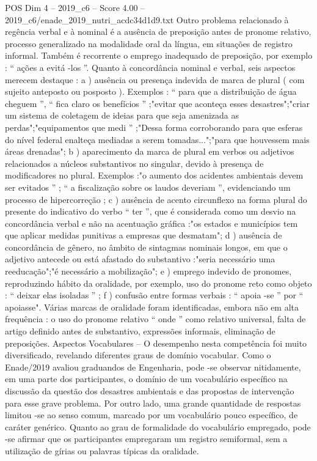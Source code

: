 \begin{textsample}{POS Dim 4 – 2019\_c6 – Score 4.00 – 2019\_c6/enade\_2019\_nutri\_acdc34d1d9.txt}
Outro problema relacionado à regência verbal e à nominal é a ausência de preposição antes de pronome relativo, processo generalizado na modalidade oral da língua, em situações de registro informal.
Também é recorrente o emprego inadequado de preposição, por exemplo : “ ações a evitá -los ”.
Quanto à concordância nominal e verbal, seis aspectos merecem destaque : a ) ausência ou presença indevida de marca de plural ( com sujeito anteposto ou posposto ).
Exemplos : “ para que a distribuição de água cheguem ”, “ fica claro os benefícios ” ;"evitar que aconteça esses desastres";"criar um sistema de coletagem de ideias para que seja amenizada as perdas";"equipamentos que medi ” ;"Dessa forma corroborando para que esferas do nível federal enalteça mediadas a serem tomadas...";"para que houvessem mais áreas drenadas"; b ) aparecimento da marca de plural em verbos ou adjetivos relacionados a núcleos substantivos no singular, devido à presença de modificadores no plural.
Exemplos :"o aumento dos acidentes ambientais devem ser evitados ” ; “ a fiscalização sobre os laudos deveriam ”, evidenciando um processo de hipercorreção ; c ) ausência de acento circunflexo na forma plural do presente do indicativo do verbo “ ter ”, que é considerada como um desvio na concordância verbal e não na acentuação gráfica :"os estados e municípios tem que aplicar medidas punitivas a empresas que desmatam"; d ) ausência de concordância de gênero, no âmbito de sintagmas nominais longos, em que o adjetivo antecede ou está afastado do substantivo :"seria necessário uma reeducação";"é necessário a mobilização"; e ) emprego indevido de pronomes, reproduzindo hábito da oralidade, por exemplo, uso do pronome reto como objeto : “ deixar elas isoladas ” ; f ) confusão entre formas verbais : “ apoia -se ” por “ apoiasse".
Várias marcas de oralidade foram identificadas, embora não em alta frequência : o uso do pronome relativo “ onde ” como relativo universal, falta de artigo definido antes de substantivo, expressões informais, eliminação de preposições.
Aspectos Vocabulares – O desempenho nesta competência foi muito diversificado, revelando diferentes graus de domínio vocabular.
Como o Enade/2019 avaliou graduandos de Engenharia, pode -se observar nitidamente, em uma parte dos participantes, o domínio de um vocabulário específico na discussão da questão dos desastres ambientais e das propostas de intervenção para esse grave problema.
Por outro lado, uma grande quantidade de respostas limitou -se ao senso comum, marcado por um vocabulário pouco específico, de caráter genérico.
Quanto ao grau de formalidade do vocabulário empregado, pode -se afirmar que os participantes empregaram um registro semiformal, sem a utilização de gírias ou palavras típicas da oralidade.

\end{textsample}
